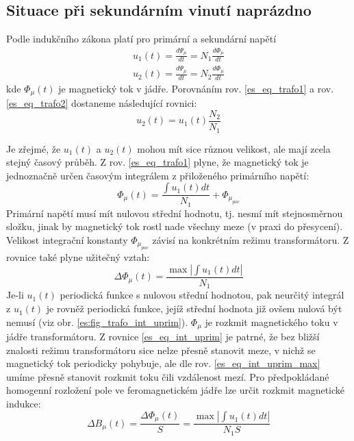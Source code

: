     \subsection{Situace při sekundárním vinutí naprázdno}\label{ES:kap_rozbor_trafa}
          
      Podle indukčního zákona platí pro primární a sekundární napětí
      \begin{subequations}
        \begin{align}
          u_1(t)=\frac{d\Psi_\mu}{dt} = N_1\frac{d\Phi_\mu}{dt}\label{es_eq_trafo1} \\
          u_2(t)=\frac{d\Psi_\mu}{dt} = N_2\frac{d\Phi_\mu}{dt}\label{es_eq_trafo2}
        \end{align}
      \end{subequations}      
      kde $\Phi_\mu(t)$ je magnetický tok v jádře. Porovnáním rov. \ref{es_eq_trafo1} a rov. 
      \ref{es_eq_trafo2} dostaneme následující rovnici:
      \begin{equation}\label{es_int_uprim_trafo}
          u_2(t)=u_1(t)\frac{N_2}{N_1}
      \end{equation}

      Je zřejmé, že $u_1(t)$ a  $u_2(t)$ mohou mít sice různou velikost, ale mají zcela stejný časový průběh. 
      Z rov. \ref{es_eq_trafo1} plyne, že magnetický tok je jednoznačně určen časovým integrálem z 
      přiloženého primárního napětí:
      \begin{equation}\label{es_eq_int_uprim}
          \Phi_\mu(t)=\frac{\int u_1(t)dt}{N_1}+\Phi_{\mu_{poc}}
      \end{equation}
      Primární napětí musí mít nulovou střední hodnotu, tj. nesmí mít stejnosměrnou složku, jinak by 
      magnetický tok rostl nade všechny meze (v praxi do přesycení). Velikost integrační konstanty 
      $\Phi_{\mu_{poc}}$ závisí na konkrétním režimu transformátoru. Z rovnice také plyne užitečný vztah:
      \begin{equation}\label{es_eq_int_uprim_max}
          \Delta\Phi_\mu(t)=\frac{\max|\int u_1(t)dt|}{N_1}
      \end{equation}
      Je-li $u_1(t)$ periodická funkce s nulovou střední hodnotou, pak neurčitý integrál z $u_1(t)$
      je rovněž periodická funkce, jejíž střední hodnota již ovšem nulová být nemusí (viz obr.
      \ref{es:fig_trafo_int_uprim}). $\Phi_\mu$ je rozkmit magnetického toku v jádře transformátoru.
      Z rovnice \ref{es_eq_int_uprim} je patrné, že bez bližší znalosti režimu transformátoru sice nelze 
      přesně stanovit meze, v nichž se magnetický tok periodicky pohybuje, ale dle rov.       
      \ref{es_eq_int_uprim_max} umíme přesně stanovit rozkmit toku čili vzdálenost mezí. Pro předpokládané 
      homogenní rozložení pole ve feromagnetickém jádře lze určit rozkmit magnetické indukce:
      \begin{equation}\label{es_eq_rozkmit_B}
        \Delta B_\mu(t)=\frac{\Delta\Phi_\mu(t)}{S}=\frac{\max|\int u_1(t)dt|}{N_1S}
      \end{equation}

